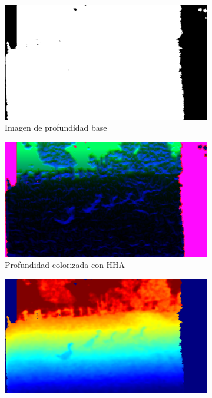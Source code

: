 \documentclass[12pt,a4paper]{report}
\begin{document}
\begin{figure}
    \centering
    \begin{subfigure}{0.45\textwidth}
        \centering
        \includegraphics[width=\textwidth]{media/data/depth_gueese.png}
        \caption{Imagen de profundidad base}
        \label{fig:depth-base}
    \end{subfigure}
    \hfill
    \begin{subfigure}{0.45\textwidth}
        \centering
        \includegraphics[width=\textwidth]{media/data/hha_gueese.png}
        \caption{Profundidad colorizada con HHA}
        \label{fig:hha-colorization}
    \end{subfigure}
    \vfill
    \begin{subfigure}{0.45\textwidth}
        \centering
        \includegraphics[width=\textwidth]{media/data/jet_gueese.png}

\end{subfigure}
\end{figure}
\end{document}
